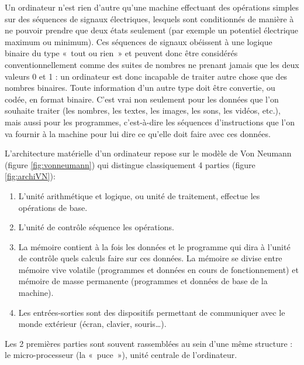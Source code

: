Un ordinateur n'est rien d'autre qu'une machine effectuant des opéra\-tions
simples sur des séquences de signaux électriques, lesquels sont conditionnés de manière à ne pouvoir
prendre que deux états seulement (par exemple un potentiel électrique maximum ou minimum). Ces
séquences de signaux obéissent à une logique binaire du type «~tout ou rien~» et peuvent donc être
considérés conventionnellement comme des suites de nombres 
ne prenant jamais que les deux valeurs 0 et 1 : 
un ordinateur est donc incapable de traiter autre chose que des 
nom\-bres binaires.
Toute information d'un autre type doit être
convertie, ou codée, en format binaire. C'est vrai non seulement pour les données que l'on
souhaite traiter (les nombres, les textes, les images, les sons, les vidéos, etc.), mais aussi 
pour les programmes, c'est-à-dire les séquences d'instructions que l'on va fournir à la machine 
pour lui dire ce qu'elle doit faire avec ces données.


L'architecture matérielle d'un ordinateur repose sur le modèle de Von Neumann
(figure \ref{fig:vonneumann}) qui distingue classiquement 4 parties (figure \ref{fig:archiVN}):
\begin{enumerate}
\item L'unité arithmétique et logique, ou unité de traitement, 
	effectue les opérations de base.
\item L'unité de contrôle séquence les opérations.
\item La mémoire contient à la fois les données et le programme qui dira à l'unité de contrôle 
	quels calculs faire sur ces données. La mémoire se divise entre mémoire vive volatile 
	(programmes et données en cours de fonctionnement) et mémoire de masse permanente 
	(programmes et données de base de la machine).
\item Les entrées-sorties sont des dispositifs permettant de communiquer avec le monde extérieur
	(écran, clavier, souris\ldots).
\end{enumerate}
Les 2 premières parties sont souvent rassemblées au sein d'une même structure : le micro-processeur
(la «~puce~»), unité centrale de l'ordinateur.

